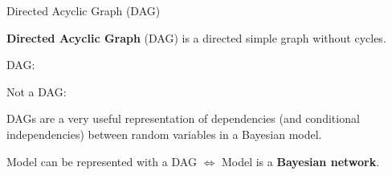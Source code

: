 \begin{frame}{Directed Acyclic Graph (DAG)}

\begin{small}
\textbf{Directed Acyclic Graph} (DAG) is a directed simple graph without cycles.

\bigskip



\begin{minipage}[c]{0.47\linewidth}
DAG:

\centering
{}
\end{minipage}
\begin{minipage}[c]{0.47\linewidth}
Not a DAG:

\centering
{}
\end{minipage}
\bigskip

DAGs are a very useful representation of dependencies (and conditional independencies) between random variables in a Bayesian model.

\bigskip

Model can be represented with a DAG $\Leftrightarrow$ Model is a \textbf{Bayesian network}.
\end{small}
\end{frame}



